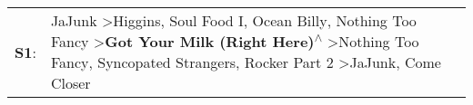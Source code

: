 \begin{supertabular}{p{0.03\textwidth}p{0.92\textwidth}}
 \textbf{S1}:  &  JaJunk\textsuperscript{} \textgreater \enspace Higgins\textsuperscript{}, \enspace Soul Food I\textsuperscript{}, \enspace Ocean Billy\textsuperscript{}, \enspace Nothing Too Fancy\textsuperscript{} \textgreater \enspace \textbf{Got Your Milk (Right Here)\textsuperscript{$\wedge$}} \textgreater \enspace Nothing Too Fancy\textsuperscript{}, \enspace Syncopated Strangers\textsuperscript{}, \enspace Rocker Part 2\textsuperscript{} \textgreater \enspace JaJunk\textsuperscript{}, \enspace Come Closer\textsuperscript{}  \enspace  \\
\end{supertabular}
